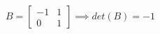 \documentclass[preview]{standalone}
\begin{document}
\begin{align*}
B = \begin{bmatrix} -1 & 1 \\ 0 & 1 \end{bmatrix} \implies det(B) = -1
\end{align*}
\end{document}
